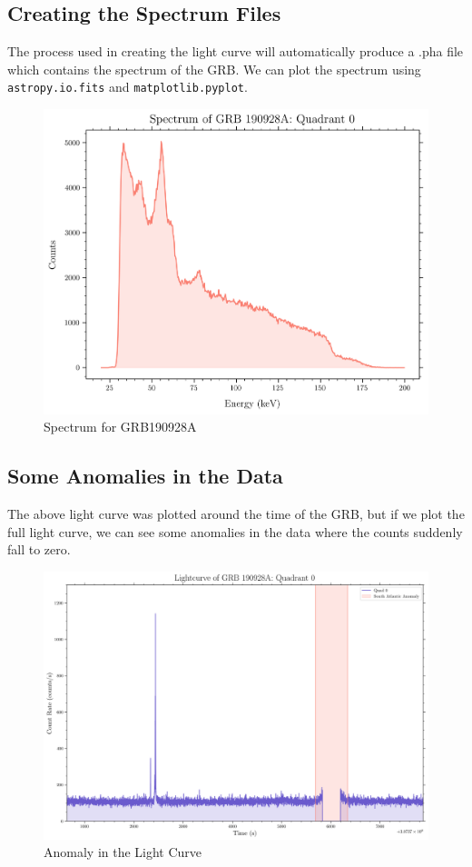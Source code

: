 \documentclass[11pt]{book} %
\begin{document}
\subsection{Creating the Spectrum Files}

The process used in creating the light curve will automatically produce a .pha file which contains the spectrum of the GRB. We can plot the spectrum using \lstinline[language=Python]{astropy.io.fits} and \lstinline[language=Python]{matplotlib.pyplot}.

\begin{figure}[H]
    \centering
    \includegraphics[scale=0.55]{Pictures/spectrum.png}
    \caption{Spectrum for GRB190928A}
\end{figure}

\subsection{Some Anomalies in the Data}

The above light curve was plotted around the time of the GRB, but if we plot the full light curve, we can see some anomalies in the data where the counts suddenly fall to zero.
\begin{figure}[H]
    \centering
    \includegraphics[scale=0.3]{Pictures/anomaly.png}
    \caption{Anomaly in the Light Curve}
    \label{fig:anomaly}
\end{figure}
\end{document}

